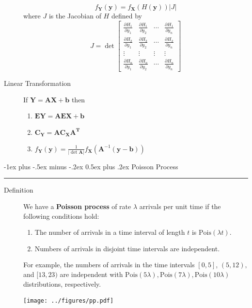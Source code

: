 \documentclass[10pt,landscape]{article}
\makeatletter
\newcommand{\Pois}{\textrm{Pois}}
\renewcommand{\section}{\@startsection{section}{1}{0mm}%
{-1ex plus -.5ex minus -.2ex}%
{0.5ex plus .2ex}%
{\normalfont\large\bfseries}}
\makeatother
\begin{document}
\begin{multicols*}{3}
\begin{description}
            \[
                f_{\mathbf{Y}}(\mathbf{y})=f_{\mathbf{X}}(H(\mathbf{y}))|J|
            \]
            where $J$ is the Jacobian of $H$ defined by
            \[
                J=\det \left[\begin{array}{cccc}
                                 \frac{\partial H_{1}}{\partial y_{1}} & \frac{\partial H_{1}}{\partial y_{2}} & \cdots & \frac{\partial H_{1}}{\partial y_{n}} \\
                                 \frac{\partial H_{2}}{\partial y_{1}} & \frac{\partial H_{2}}{\partial y_{2}} & \cdots & \frac{\partial H_{2}}{\partial y_{n}} \\
                                 \vdots                                & \vdots                                & \vdots & \vdots                                \\
                                 \frac{\partial H_{n}}{\partial y_{1}} & \frac{\partial H_{n}}{\partial y_{2}} & \cdots & \frac{\partial H_{n}}{\partial y_{n}}
                \end{array}\right]
            \]
            \item[Linear Transformation] If $\mathbf{Y} = \mathbf{AX + b}$ then
            \begin{enumerate}
                \item $\mathbf{EY} = \mathbf{AEX + b}$
                \item $\mathbf{C}_{\mathbf{Y}}=\mathbf{A} \mathbf{C}_{\mathbf{X}} \mathbf{A}^{\mathbf{T}}$
                \item $f_{\mathbf{Y}}(\mathbf{y})=\frac{1}{|\det{\mathbf{A}}|} f_{\mathbf{X}}\left(\mathbf{A}^{-1}(\mathbf{y}-\mathbf{b})\right)$
            \end{enumerate}
        \end{description}


        \section{Poisson Process}\smallskip \hrule height 2pt \smallskip
        \begin{description}
            \item[Definition] We have a \textbf{Poisson process} of rate $\lambda$ arrivals per unit time if the following conditions hold:
            \begin{enumerate}
                \item The number of arrivals in a time interval of length $t$ is $\Pois(\lambda t)$.
                \item Numbers of arrivals in disjoint time intervals are independent.
            \end{enumerate}
            For example, the numbers of arrivals in the time intervals $[0,5]$, $(5,12),$ and $[13,23)$ are independent with $\Pois(5\lambda), \Pois(7\lambda), \Pois(10\lambda)$ distributions, respectively.
            \begin{minipage}{\linewidth}
                \centering
                \texttt{[image: ../figures/pp.pdf]}
            \end{minipage}


\end{description}
\end{multicols*}
\end{document}
